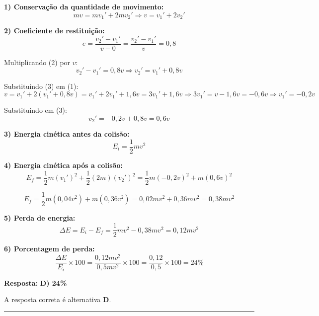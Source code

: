 \documentclass[a4paper,12pt]{article}
\begin{document}
\begin{flushleft}
\textbf{1) Conservação da quantidade de movimento:}
\[
mv = mv_1' + 2mv_2' \Rightarrow v = v_1' + 2v_2' \tag{1}
\]

\textbf{2) Coeficiente de restituição:}
\[
e = \frac{v_2' - v_1'}{v - 0} = \frac{v_2' - v_1'}{v} = 0{,}8 \tag{2}
\]

Multiplicando (2) por $v$:
\[
v_2' - v_1' = 0{,}8v \Rightarrow v_2' = v_1' + 0{,}8v \tag{3}
\]

Substituindo (3) em (1):
\[
v = v_1' + 2(v_1' + 0{,}8v) = v_1' + 2v_1' + 1{,}6v = 3v_1' + 1{,}6v
\Rightarrow 3v_1' = v - 1{,}6v = -0{,}6v
\Rightarrow v_1' = -0{,}2v
\]

Substituindo em (3):
\[
v_2' = -0{,}2v + 0{,}8v = 0{,}6v
\]

\textbf{3) Energia cinética antes da colisão:}
\[
E_i = \frac{1}{2}mv^2
\]

\textbf{4) Energia cinética após a colisão:}
\[
E_f = \frac{1}{2}m(v_1')^2 + \frac{1}{2}(2m)(v_2')^2 
= \frac{1}{2}m(-0{,}2v)^2 + m(0{,}6v)^2 
\]

\[
E_f = \frac{1}{2}m(0{,}04v^2) + m(0{,}36v^2) 
= 0{,}02mv^2 + 0{,}36mv^2 = 0{,}38mv^2
\]


\textbf{5) Perda de energia:}
\[
\Delta E = E_i - E_f = \frac{1}{2}mv^2 - 0{,}38mv^2 = 0{,}12mv^2
\]

\textbf{6) Porcentagem de perda:}
\[
\frac{\Delta E}{E_i} \times 100 = \frac{0{,}12mv^2}{0{,}5mv^2} \times 100 
= \frac{0{,}12}{0{,}5} \times 100 = 24\%
\]

\textbf{Resposta:} \textbf{D) 24\%}

A resposta correta é alternativa \colorbox{green!50}{\textbf{D}}.

\end{flushleft}

\noindent\rule{\linewidth}{0.6pt}\\
\end{document}
